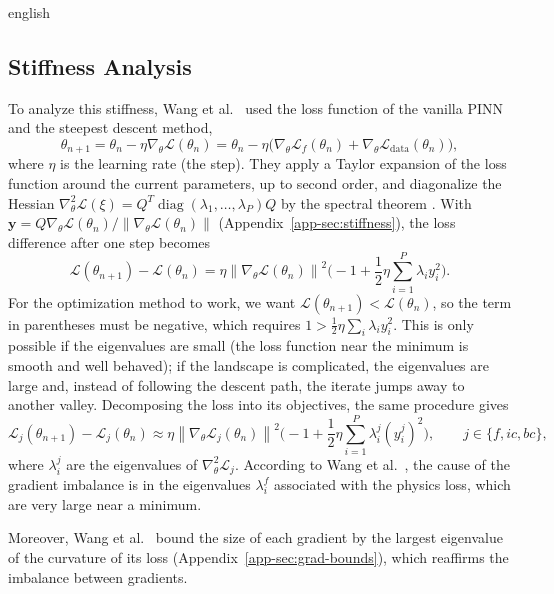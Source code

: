 \documentclass[12pt,letterpaper,twoside]{book}
\newcommand{\norm}[1]{\left\lVert #1 \right\rVert}
\newcommand{\Loss}{\mathcal{L}}
\DeclareMathOperator{\diag}{diag}
\begin{document}
\begin{hyphenrules}{english}
\subsection{Stiffness Analysis}

To analyze this stiffness, Wang et al.~\cite{wang2021gradient} used the loss function of the vanilla PINN and
the steepest descent method,
\begin{equation}
  \theta_{n+1}=\theta_n-\eta\nabla_\theta\Loss(\theta_n)=\theta_n-\eta\big(\nabla_\theta\Loss_f(\theta_n)+\nabla_\theta\Loss_{\mathrm{data}}(\theta_n)\big),
  \label{eq:gd}
\end{equation}
where $\eta$ is the learning rate (the step). They apply a Taylor expansion of the loss function around the current parameters, up to second order,
and diagonalize the Hessian $\nabla^2_\theta\Loss(\xi)=Q^{T}\diag(\lambda_1,\dots,\lambda_P)Q$ by the
spectral theorem \cite{trefethen1997}. With $\mathbf{y}=Q\nabla_\theta\Loss(\theta_n)/\norm{\nabla_\theta\Loss(\theta_n)}$
(Appendix~\ref{app-sec:stiffness}), the loss difference after one step becomes
\begin{equation}
  \Loss(\theta_{n+1})-\Loss(\theta_n)=\eta\norm{\nabla_\theta\Loss(\theta_n)}^2
  \Big(-1+\frac12\eta\sum_{i=1}^{P}\lambda_iy_i^2\Big).
  \label{eq:stiffness}
\end{equation}
For the optimization method to work, we want $\Loss(\theta_{n+1})<\Loss(\theta_n)$, so the term in
parentheses must be negative, which requires $1>\frac12\eta\sum_i\lambda_iy_i^2$. This is only possible if
the eigenvalues are small (the loss function near the minimum is smooth and well behaved); if the
landscape is complicated, the eigenvalues are large and, instead of following the descent path, the
iterate jumps away to another valley. Decomposing the loss into its objectives, the same procedure gives
\begin{equation}
  \Loss_j(\theta_{n+1})-\Loss_j(\theta_n)\approx\eta\norm{\nabla_\theta\Loss_j(\theta_n)}^2
  \Big(-1+\frac12\eta\sum_{i=1}^{P}\lambda^{j}_i(y^{j}_i)^2\Big),\qquad j\in\{f,ic,bc\},
  \label{eq:stiffness-split}
\end{equation}
where $\lambda^{j}_i$ are the eigenvalues of $\nabla^2_\theta\Loss_j$. According to
Wang et al.~\cite{wang2021gradient}, the cause of the gradient imbalance is in the eigenvalues $\lambda^{f}_i$
associated with the physics loss, which are very large near a minimum.

Moreover, Wang et al.~\cite{wang2021gradient} bound the size of each gradient by the largest eigenvalue of
the curvature of its loss (Appendix~\ref{app-sec:grad-bounds}), which reaffirms the imbalance between
gradients.


\end{hyphenrules}
\end{document}
